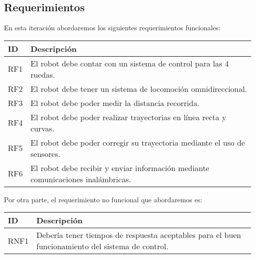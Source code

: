\subsection{Requerimientos}

En esta iteración abordaremos los siguientes requerimientos funcionales:

\begin{center} 
    \begin{tabular} {
        | >{\centering\arraybackslash}m{1cm}
        | >{\centering\arraybackslash}m{13cm} |}
        \hline
            ID & Descripción \\
        \hline
            RF1 & El robot debe contar con un sistema de control para las 4 ruedas. \\
        \hline
            RF2 & El robot debe tener un sistema de locomoción omnidireccional. \\
        \hline
            RF3 & El robot debe poder medir la distancia recorrida. \\
        \hline
            RF4 & El robot debe poder realizar trayectorias en línea recta y curvas. \\
        \hline
            RF5 & El robot debe poder corregir su trayectoria mediante el uso de sensores. \\
        \hline
            RF6 & El robot debe recibir y enviar información mediante comunicaciones inalámbricas. \\
        \hline
    \end{tabular}
\end{center}
  
   Por otra parte, el requerimiento no funcional que abordaremos es:
  
\begin{center}
    \begin{tabular} {
        | >{\centering\arraybackslash}m{1cm}
        | >{\centering\arraybackslash}m{13cm} |}
        \hline
        ID & Descripción \\
        \hline
        RNF1 & Debería tener tiempos de respuesta aceptables para el buen funcionamiento del sistema de control. \\
        \hline
    \end{tabular}
\end{center}